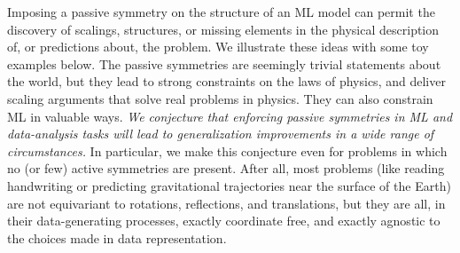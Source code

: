 \documentclass{article}
\theoremstyle{plain}
\theoremstyle{definition}
\theoremstyle{remark}
\begin{document}
Imposing a passive symmetry on the structure of an ML model can permit the discovery of scalings, structures, or missing elements in the physical description of, or predictions about, the problem.
We illustrate these ideas with some toy examples below.
The passive symmetries are seemingly trivial statements about the world, but they lead to strong constraints on the laws of physics, and deliver scaling arguments that solve real problems in physics.
They can also constrain ML in valuable ways.
\emph{We conjecture that enforcing passive symmetries in ML and data-analysis tasks will lead to generalization improvements in a wide range of circumstances.}
In particular, we make this conjecture even for problems in which no (or few) active symmetries are present.
After all, most problems (like reading handwriting or predicting gravitational trajectories near the surface of the Earth) are not equivariant to rotations, reflections, and translations, but they are all, in their data-generating processes, exactly coordinate free, and exactly agnostic to the choices made in data representation.
\end{document}

